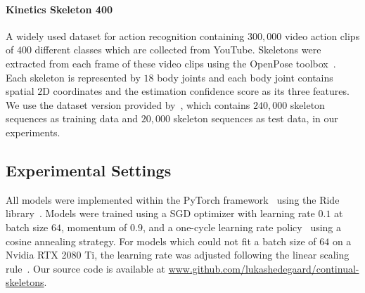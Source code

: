 \documentclass[journal]{IEEEtran}
\theoremstyle{definition}
\begin{document}
\paragraph{Kinetics Skeleton 400~\textnormal{\cite{kay2017kinetics}}} A widely used dataset for action recognition containing $300{,}000$ video action clips of $400$ different classes which are collected from YouTube. Skeletons were extracted from each frame of these video clips using the OpenPose toolbox~\cite{cao2019openpose}. Each skeleton is represented by $18$ body joints and each body joint contains spatial $2$D coordinates and the estimation confidence score as its three features. We use the dataset version provided by~\cite{yan2018spatial}, which contains $240{,}000$ skeleton sequences as training data and $20{,}000$ skeleton sequences as test data, in our experiments. 


\subsection{Experimental Settings}\label{sec:exp-settings}
All models were implemented within the PyTorch framework~\cite{paszke2017automatic} using the Ride library~\cite{hedegaard2021ride}. Models were trained using a SGD optimizer with learning rate $0.1$ at batch size $64$, momentum of $0.9$, and a one-cycle learning rate policy~\cite{smith2019superconvergence} using a cosine annealing strategy. For models which could not fit a batch size of $64$ on a Nvidia RTX 2080 Ti, the learning rate was adjusted following the linear scaling rule~\cite{goyal2017accurate}.
Our source code is available at \url{www.github.com/lukashedegaard/continual-skeletons}.
\end{document}
